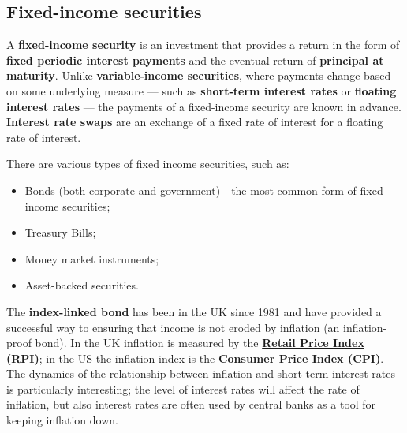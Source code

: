 \subsection{Fixed-income securities}
A \textbf{fixed-income security} is an investment that provides a return in the form of \textbf{fixed periodic interest payments} and the eventual return of \textbf{principal at maturity}. Unlike \textbf{variable-income securities}, where payments change based on some underlying measure — such as \textbf{short-term interest rates} or \textbf{floating interest rates} — the payments of a fixed-income security are known in advance. \textbf{Interest rate swaps} are an exchange of a fixed rate of interest for a floating rate of interest.

There are various types of fixed income securities, such as:

\begin{itemize}
    \setlength\itemsep{0em}
    \item Bonds (both corporate and government) - the most common form of fixed-income securities;
    \item Treasury Bills;
    \item Money market instruments;
    \item Asset-backed securities.
\end{itemize}

The \textbf{index-linked bond} has been in the UK since 1981 and have provided a successful way to ensuring that income is not eroded by inflation (an inflation-proof bond). In the UK inflation is measured by the \href{https://www.investopedia.com/terms/r/rpi.asp}{\textbf{Retail Price Index (RPI)}}; in the US the inflation index is the \href{https://www.investopedia.com/terms/c/consumerpriceindex.asp}{\textbf{Consumer Price Index (CPI)}}. The dynamics of the relationship between inflation and short-term interest rates is particularly interesting; the level of interest rates will affect the rate of inflation, but also interest rates are often used by central banks as a tool for keeping inflation down.


